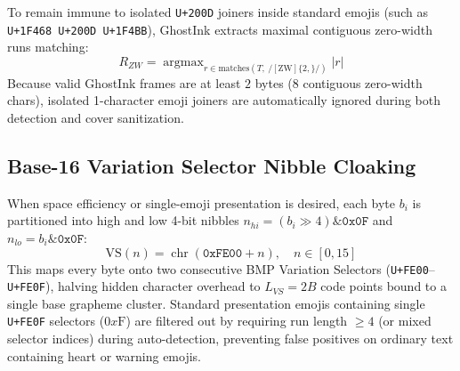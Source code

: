 \documentclass[12pt,a4paper,oneside,openany]{report}
\begin{document}
To remain immune to isolated \texttt{U+200D} joiners inside standard emojis (such as \texttt{U+1F468 U+200D U+1F4BB}), GhostInk extracts maximal contiguous zero-width runs matching:
\begin{equation}
    R_{ZW} = \operatorname{argmax}_{r \in \text{matches}(T,\ /[\text{ZW}]\{2,\}/)} |r|
\end{equation}
Because valid GhostInk frames are at least $2$ bytes ($8$ contiguous zero-width chars), isolated 1-character emoji joiners are automatically ignored during both detection and cover sanitization.

\subsection{Base-16 Variation Selector Nibble Cloaking}
When space efficiency or single-emoji presentation is desired, each byte $b_i$ is partitioned into high and low 4-bit nibbles $n_{hi} = (b_i \gg 4) \mathbin{\&} \texttt{0x0F}$ and $n_{lo} = b_i \mathbin{\&} \texttt{0x0F}$:
\begin{equation}
    \text{VS}(n) = \operatorname{chr}(\texttt{0xFE00} + n), \quad n \in [0, 15]
\end{equation}
This maps every byte onto two consecutive BMP Variation Selectors (\texttt{U+FE00}--\texttt{U+FE0F}), halving hidden character overhead to $L_{VS} = 2B$ code points bound to a single base grapheme cluster. Standard presentation emojis containing single \texttt{U+FE0F} selectors ($0x\text{F}$) are filtered out by requiring run length $\ge 4$ (or mixed selector indices) during auto-detection, preventing false positives on ordinary text containing heart or warning emojis.
\end{document}
